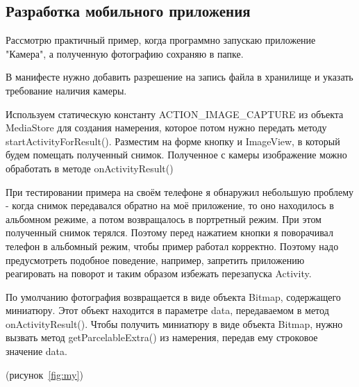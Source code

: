 \subsection{Разработка мобильного приложения}

Рассмотрю практичный пример, когда программно запускаю приложение "Камера", а полученную фотографию сохраняю в папке.~\cite{camera}

В манифесте нужно добавить разрешение на запись файла в хранилище и указать требование наличия камеры.

Используем статическую константу ACTION\_IMAGE\_CAPTURE из объекта MediaStore для создания намерения, которое потом нужно передать методу startActivityForResult(). Разместим на форме кнопку и ImageView, в который будем помещать полученный снимок. Полученное с камеры изображение можно обработать в методе onActivityResult()

При тестировании примера на своём телефоне я обнаружил небольшую проблему - когда снимок передавался обратно на моё приложение, то оно находилось в альбомном режиме, а потом возвращалось в портретный режим. При этом полученный снимок терялся. Поэтому перед нажатием кнопки я поворачивал телефон в альбомный режим, чтобы пример работал корректно. Поэтому надо предусмотреть подобное поведение, например, запретить приложению реагировать на поворот и таким образом избежать перезапуска Activity. 

По умолчанию фотография возвращается в виде объекта Bitmap, содержащего миниатюру. Этот объект находится в параметре data, передаваемом в метод onActivityResult(). Чтобы получить миниатюру в виде объекта Bitmap, нужно вызвать метод getParcelableExtra() из намерения, передав ему строковое значение data.

(рисунок~\ref{fig:my})

